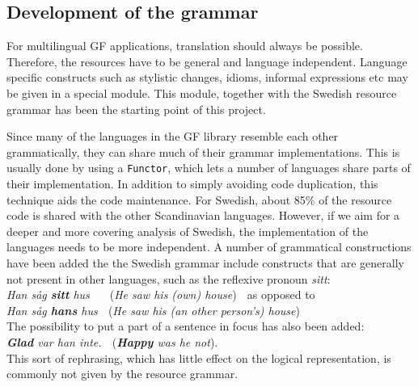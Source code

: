 \documentclass[submission]{eptcs} %
\begin{document}

\subsection{Development of the grammar}
For multilingual GF applications, translation should always be possible.
Therefore, the resources have to be general and language independent.
Language specific constructs such as stylistic changes, idioms, informal
expressions etc may be given in a special module.
This module, together with the Swedish resource grammar has been the starting
point of this project.

Since many of the languages in the GF library resemble each other grammatically,
they can share much of their grammar implementations. This is usually done by using a
\verb|Functor|, which lets a number of languages share parts of their implementation. 
In addition to simply avoiding code duplication, this technique aids the code maintenance.
For Swedish, about 85\% of the resource code is shared with the other Scandinavian
languages. %
However, if we aim for a deeper and more covering analysis of Swedish,
the implementation of the languages needs to be more independent.
A number of grammatical constructions have been added the the Swedish grammar
include constructs that are generally not present in other languages,
such as the reflexive pronoun \emph{sitt}: \\
\emph{Han såg \textbf{sitt} hus} $\; \; \; \;$ (\emph{He saw his (own) house}) $\;$
as opposed to \\
\emph{Han såg \textbf{hans} hus} $\;$ (\emph{He saw his (an other person's) house}) \\
The possibility to put a part of a sentence in focus has also been added:\\
\emph{\textbf{Glad} var han inte.} $\;$ (\emph{\textbf{Happy} was he not}). \\
This sort of rephrasing, which has little effect on the logical representation,
is commonly not given by the resource grammar.
\end{document}

